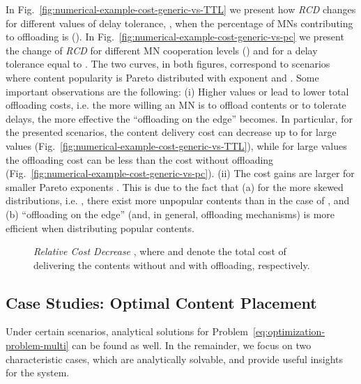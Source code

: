 \documentclass[10pt,conference,letterpaper]{IEEEtran}
\begin{document}
In Fig.~\ref{fig:numerical-example-cost-generic-vs-TTL} we present how \textit{RCD} changes for different values of delay tolerance, , when the percentage of MNs contributing to offloading is  (). In Fig.~\ref{fig:numerical-example-cost-generic-vs-pc} we present the change of \textit{RCD} for different MN cooperation levels () and for a delay tolerance equal to . The two curves, in both figures, correspond to scenarios where content popularity is Pareto distributed with exponent  and . Some important observations are the following: (i) Higher values  or  lead to lower total offloading costs, i.e. the more willing an MN is to offload contents or to tolerate delays, the more effective the ``offloading on the edge'' becomes. In particular, for the presented scenarios, the content delivery cost can decrease up to  for large  values (Fig.~\ref{fig:numerical-example-cost-generic-vs-TTL}), while for large  values the offloading cost can be  less than the cost without offloading (Fig.~\ref{fig:numerical-example-cost-generic-vs-pc}). (ii) The cost gains are larger for smaller Pareto exponents . This is due to the fact that (a) for the more skewed distributions, i.e. , there exist more unpopular contents than in the case of , and (b) ``offloading on the edge'' (and, in general, offloading mechanisms) is more efficient when distributing popular contents.




\begin{figure}
\caption{\textit{Relative Cost Decrease} , where  and  denote the total cost of delivering the contents without and with offloading, respectively.}
\label{fig:numerical-example-cost-generic}
\end{figure}


\subsection{Case Studies: Optimal Content Placement}

Under certain scenarios, analytical solutions for Problem~\ref{eq:optimization-problem-multi} can be found as well. In the remainder, we focus on two characteristic cases, which are analytically solvable, and provide useful insights for the system.
\end{document}
